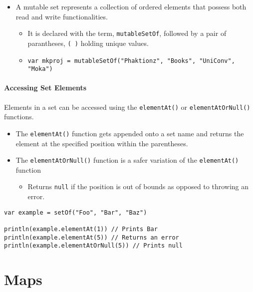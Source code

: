\begin{itemize}
    \item A mutable set represents a collection of ordered elements that possess both read and write functionalities.
          \begin{itemize}
              \item It is declared with the term, \verb!mutableSetOf!, followed by a pair of parantheses, \verb!( )! holding unique values.
              \item \verb!var mkproj = mutableSetOf("Phaktionz", "Books", "UniConv", "Moka")!
          \end{itemize}
\end{itemize}

\paragraph{Accessing Set Elements}
Elements in a set can be accessed using the \verb!elementAt()! or \verb!elementAtOrNull()! functions.

\begin{itemize}
    \item The \verb!elementAt()! function gets appended onto a set name and returns the element at the specified position within the parentheses.
    \item The \verb!elementAtOrNull()! function is a safer variation of the \verb!elementAt()! function
          \begin{itemize}
              \item Returns \verb!null! if the position is out of bounds as opposed to throwing an error.
          \end{itemize}
\end{itemize}

\begin{verbatim}
var example = setOf("Foo", "Bar", "Baz")

println(example.elementAt(1)) // Prints Bar
println(example.elementAt(5)) // Returns an error 
println(example.elementAtOrNull(5)) // Prints null
\end{verbatim}
\newpage
\section{Maps}
